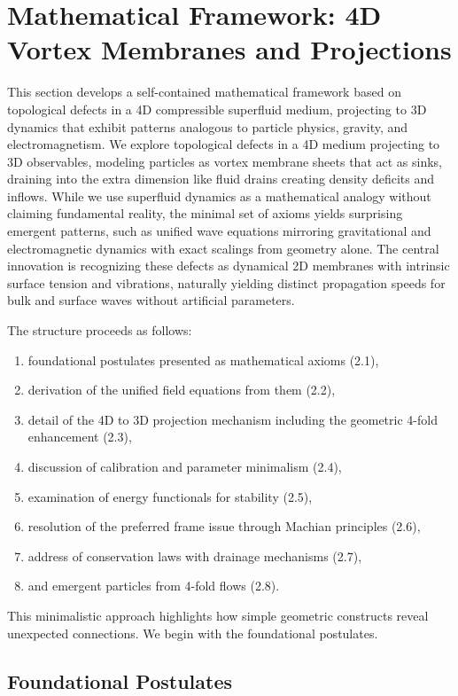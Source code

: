 \section{Mathematical Framework: 4D Vortex Membranes and Projections}

This section develops a self-contained mathematical framework based on topological defects in a 4D compressible superfluid medium, projecting to 3D dynamics that exhibit patterns analogous to particle physics, gravity, and electromagnetism. We explore topological defects in a 4D medium projecting to 3D observables, modeling particles as vortex membrane sheets that act as sinks, draining into the extra dimension like fluid drains creating density deficits and inflows. While we use superfluid dynamics as a mathematical analogy without claiming fundamental reality, the minimal set of axioms yields surprising emergent patterns, such as unified wave equations mirroring gravitational and electromagnetic dynamics with exact scalings from geometry alone. The central innovation is recognizing these defects as dynamical 2D membranes with intrinsic surface tension and vibrations, naturally yielding distinct propagation speeds for bulk and surface waves without artificial parameters.

The structure proceeds as follows:
\begin{enumerate}
\item foundational postulates presented as mathematical axioms (2.1),
\item derivation of the unified field equations from them (2.2),
\item detail of the 4D to 3D projection mechanism including the geometric 4-fold enhancement (2.3),
\item discussion of calibration and parameter minimalism (2.4),
\item examination of energy functionals for stability (2.5),
\item resolution of the preferred frame issue through Machian principles (2.6),
\item address of conservation laws with drainage mechanisms (2.7),
\item and emergent particles from 4-fold flows (2.8).
\end{enumerate}
This minimalistic approach highlights how simple geometric constructs reveal unexpected connections. We begin with the foundational postulates.

\subsection{Foundational Postulates}

